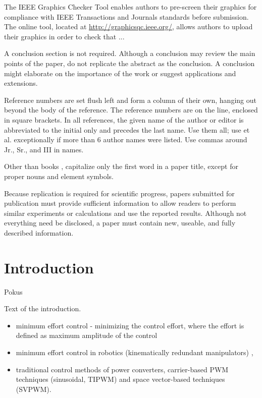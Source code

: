 \documentclass[journal]{IEEEtranTIE}
\theoremstyle{definition}
\begin{document}
The IEEE Graphics Checker Tool enables authors to pre-screen their graphics for compliance with IEEE Transactions and Journals standards before submission. The online tool, located at \url{http://graphicsqc.ieee.org/}, allows authors to upload their graphics in order to check that ... 

A conclusion section is not required. Although a conclusion may review the main points of the paper, do not replicate the abstract as the conclusion. A conclusion might elaborate on the importance of the work or suggest applications and extensions.

Reference numbers are set flush left and form a column of their own, hanging out beyond the body of the reference. The reference numbers are on the line, enclosed in square brackets. In all references, the given name of the author or editor is abbreviated to the initial only and precedes the last name. Use them all; use et al. exceptionally if more than 6 author names were listed. Use commas around Jr., Sr., and III in names. 

Other than books \cite{inbook1, book1, book2, book3}, capitalize only the first word in a paper title, except for proper nouns and element symbols. 

Because replication is required for scientific progress, papers submitted for publication must provide sufficient information to allow readers to perform similar experiments or calculations and use the reported results. Although not everything need be disclosed, a paper must contain new, useable, and fully described information.

\newpage





\section{Introduction}

Pokus

Text of the introduction.
\begin{itemize}
\item minimum effort control - minimizing the control effort, where the
effort is defined as maximum amplitude of the control \cite{neustadt1962minimum,porter1966note,Tomlin1975}
\item minimum effort control in robotics (kinematically redundant manipulators)
\cite{ajoudani2013human,lee2001structured,Shim1998,Lee&Ha2001}, 
\item traditional control methods of power converters, carrier-based PWM
techniques (sinusoidal, TIPWM) and space vector-based techniques (SVPWM).
\end{itemize}
\end{document}
